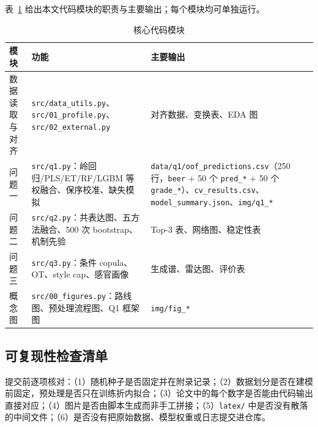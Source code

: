 表~\ref{tab:appendix-code} 给出本文代码模块的职责与主要输出；每个模块均可单独运行。

\begin{table}[htbp]
  \centering
  \caption{核心代码模块}
  \label{tab:appendix-code}
  \small
  \begin{tabularx}{\textwidth}{@{}l X X@{}}
    \toprule
    模块 & 功能 & 主要输出 \\
    \midrule
    数据读取与对齐 & \texttt{src/data\_utils.py}、\texttt{src/01\_profile.py}、\texttt{src/02\_external.py} & 对齐数据、变换表、EDA 图 \\
    问题一 & \texttt{src/q1.py}：岭回归/PLS/ET/RF/LGBM 等权融合、保序校准、缺失模拟 & \texttt{data/q1/oof\_predictions.csv}（250 行，\texttt{beer} + 50 个 \texttt{pred\_*} + 50 个 \texttt{grade\_*}）、\texttt{cv\_results.csv}、\texttt{model\_summary.json}、\texttt{img/q1\_*} \\
    问题二 & \texttt{src/q2.py}：共表达图、五方法融合、500 次 bootstrap、机制先验 & Top-3 表、网络图、稳定性表 \\
    问题三 & \texttt{src/q3.py}：条件 copula、OT、style cap、感官画像 & 生成谱、雷达图、评价表 \\
    概念图 & \texttt{src/00\_figures.py}：路线图、预处理流程图、Q1 框架图 & \texttt{img/fig\_*} \\
    \bottomrule
  \end{tabularx}
\end{table}

\subsection{可复现性检查清单}

提交前逐项核对：（1）随机种子是否固定并在附录记录；（2）数据划分是否在建模前固定，预处理是否只在训练折内拟合；（3）论文中的每个数字是否能由代码输出直接对应；（4）图片是否由脚本生成而非手工拼接；（5）\texttt{latex/} 中是否没有散落的中间文件；（6）是否没有把原始数据、模型权重或日志提交进仓库。
